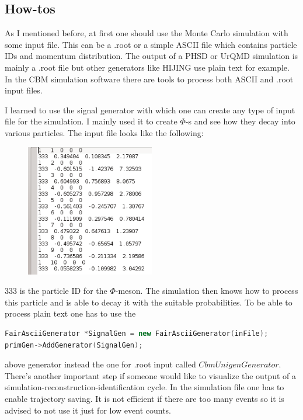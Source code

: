 \documentclass[a4paper,12pt]{article}
\begin{document}
\subsection{ How-tos}
\vspace{3mm}
\par As I mentioned before, at first one should use the Monte Carlo simulation with some input file. This can be a 
.root or a simple ASCII file which contains particle IDs and momentum distribution. The output of a PHSD or UrQMD simulation
 is mainly a .root file but other generators like HIJING use plain text for example. In the CBM simulation software there are 
 tools to process both ASCII and .root input files.
\vspace{3mm}
\par I learned to use the signal generator with which one can create any type of input file for the simulation. I mainly used
 it to create $\Phi$-s and see how they decay into various particles. The input file looks like the following:
\begin{figure}[H]
	\centering
	\includegraphics[width=0.5\textwidth]{input.png}
\end{figure}
\par 333 is the particle ID for the $\Phi$-meson. The simulation then knows how to process this particle and is able to decay
 it with the suitable probabilities. To be able to process plain text one has to use the
\begin{lstlisting}[language=C++]
FairAsciiGenerator *SignalGen = new FairAsciiGenerator(inFile);
primGen->AddGenerator(SignalGen);
\end{lstlisting}
above generator instead the one for .root input called $CbmUnigenGenerator$. There's another important step if someone would
 like to visualize the output of a simulation-reconstruction-identification cycle. In the simulation file one has to enable
  trajectory saving. It is not efficient if there are too many events so it is advised to not use it just for low event counts.
\end{document}
